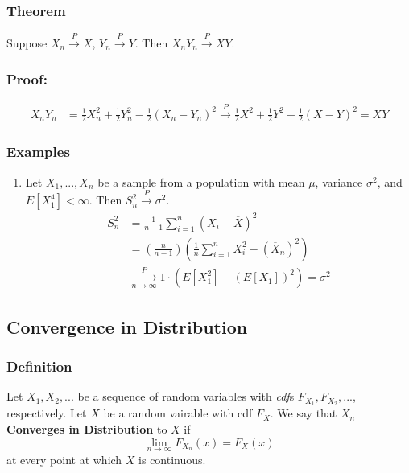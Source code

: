 \documentclass{article}
\begin{document}
\subsubsection{Theorem}
Suppose $X_n \xrightarrow{P} X$, $Y_n\xrightarrow{P}Y$. Then $X_nY_n \xrightarrow{P} XY$.

\subsubsection*{Proof:}
\begin{equation*}
    \begin{split}
        X_nY_n &= \frac{1}{2}X_n^2 + \frac{1}{2}Y_n^2 - \frac{1}{2}(X_n - Y_n)^2 \xrightarrow{P} \frac{1}{2}X^2 + \frac{1}{2}Y^2 - \frac{1}{2}(X-Y)^2 = XY
    \end{split}
\end{equation*}

\subsubsection{Examples}
\begin{enumerate}
    \item Let $X_1,...,X_n$ be a sample from a population with mean $\mu$, variance $\sigma^2$, and $E[X_1^4] < \infty$. Then $S_n^2 \xrightarrow{P} \sigma^2$.
    \begin{equation*}
        \begin{split}
            S_n^2 &= \frac{1}{n-1}\sum_{i=1}^n (X_i - \overline{X})^2\\
            &= \left(\frac{n}{n-1} \right)\left(\frac{1}{n} \sum_{i=1}^n X_i^2 - \left(\overline{X}_n \right)^2 \right)\\
            &\xrightarrow[n\to\infty]{P} 1 \cdot \left(E[X_1^2] - (E[X_1])^2 \right) = \sigma^2
        \end{split}
    \end{equation*}
\end{enumerate}

\subsection{Convergence in Distribution}
\subsubsection*{Definition}
Let $X_1,X_2,...$ be a sequence of random variables with \textit{cdf}s $F_{X_1},F_{X_2},...$, respectively. Let $X$ be a random vairable with cdf $F_X$. We say that $X_n$ \textbf{Converges in Distribution} to $X$ if
\begin{equation*}
    \lim_{n\to\infty} F_{X_n}(x) = F_X(x)
\end{equation*}
at every point at which $X$ is continuous.
\end{document}
